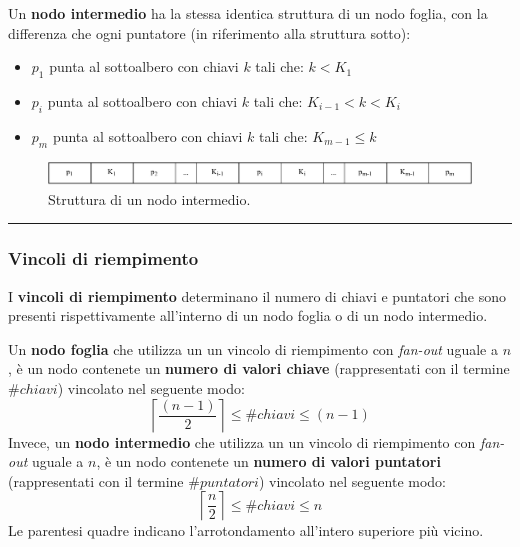 \documentclass[a4paper]{article}
\newcommand{\longline}{\noindent\rule{\textwidth}{0.4pt}}
\begin{document}
	Un \textcolor{Red3}{\textbf{nodo intermedio}} ha la stessa identica struttura di un nodo foglia, con la differenza che ogni puntatore (in riferimento alla struttura sotto):
	\begin{itemize}
		\item $p_{1}$ punta al sottoalbero con chiavi $k$ tali che: $k < K_{1}$
		
		\item $p_{i}$ punta al sottoalbero con chiavi $k$ tali che: $K_{i-1} < k < K_{i}$
		
		\item $p_{m}$ punta al sottoalbero con chiavi $k$ tali che: $K_{m-1} \le k$
	\end{itemize}
	\begin{figure}[!htp]
		\centering
		\includegraphics[width=\textwidth]{img/B+-tree_intermedio.pdf}
		\caption{Struttura di un nodo intermedio.}
	\end{figure}

	\longline
	
	\subsubsection{Vincoli di riempimento}\label{par: vincoli di riempimento}
	
	I \textcolor{Red3}{\textbf{vincoli di riempimento}} determinano il numero di chiavi e puntatori che sono presenti rispettivamente all'interno di un nodo foglia o di un nodo intermedio.\newline
	
	\noindent
	Un \textbf{nodo foglia} che utilizza un un vincolo di riempimento con \emph{fan-out} uguale a $n$, è un nodo contenete un \textbf{numero di valori chiave} (rappresentati con il termine $\#chiavi$) vincolato nel seguente modo:
	\begin{equation*}
		\left\lceil \dfrac{\left(n-1\right)}{2} \right\rceil \le \#chiavi \le \left(n-1\right)
	\end{equation*}
	Invece, un \textbf{nodo intermedio} che utilizza un un vincolo di riempimento con \emph{fan-out} uguale a $n$, è un nodo contenete un \textbf{numero di valori puntatori} (rappresentati con il termine $\#puntatori$) vincolato nel seguente modo:
	\begin{equation*}
		\left\lceil \dfrac{n}{2} \right\rceil \le \#chiavi \le n
	\end{equation*}
	Le parentesi quadre indicano l'arrotondamento all'intero superiore più vicino.\newpage
	
\end{document}
